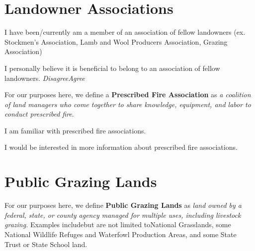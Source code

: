 \documentclass[
  english,
  checkmode = fill,
  ]{sdapsclassic}
\begin{document}
\begin{questionnaire}
    
\section{Landowner Associations}
    
    \begin{choicequestion}[cols=4]{I have been/currently am a member of an association of fellow landowners (ex. Stockmen's Association, Lamb and Wool Producers Association, Grazing Association)}

    \end{choicequestion}

     \begin{markgroup}{I personally believe it is beneficial to belong to an association of fellow landowners.}
      \markline{ }
 {\emph{Disagree}}{\emph{Agree}~~}~{}~{}
      \end{markgroup}

For our purposes here, we define a \textbf{Prescribed Fire Association} as \emph{a coalition of land managers who come together to share knowledge, equipment, and labor to conduct prescribed fire}. 
    
    \begin{choicequestion}[cols=4]{I am familiar with prescribed fire associations.}
    \end{choicequestion}    
    
    \begin{choicequestion}[cols=4]{I would be interested in more information about prescribed fire associations.}
    \end{choicequestion}    
    
\newpage 

 \section{Public Grazing Lands}
    
For our purposes here, we define \textbf{Public Grazing Lands} as \emph{land owned by a federal, state, or county agency managed for multiple uses, including livestock grazing.} 
Examples include\textemdash but are not limited to\textemdash National Grasslands, some National Wildlife Refuges and Waterfowl Production Areas, and some State Trust or State School land. 
    

\end{questionnaire}
\end{document}

